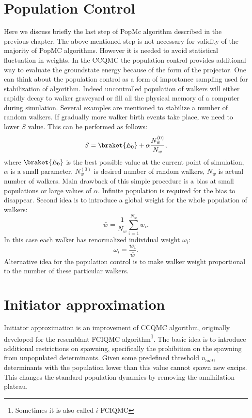 \documentclass[twoside,english]{uiofysmaster}
\begin{document}
\section{Population Control}
Here we discuss briefly the last step of PopMc algorithm described in the previous chapter. The above mentioned step is not necessary for validity of the majority of PopMC algorithms. However it is needed to avoid statistical fluctuation in weights. In the CCQMC the population control provides additional way to evaluate the groundstate energy because of the form of the projector. One can think about the population control as a form of importance sampling used for stabilization of algorithm. Indeed uncontrolled population of walkers will either rapidly decay to walker graveyard or fill all the physical memory of a computer during simulation. Several examples are mentioned to stabilize a number of random walkers. If gradually more walker birth events take place, we need to lower $S$ value. This can be performed as follows:
\begin{equation}
S = \braket{E_0} + \alpha \frac{N_w^{(0)}}{N_w},
\end{equation}  
where $\braket{E_0}$ is the best possible value at the current point of simulation, $\alpha$ is a small parameter, $N_w^{(0)}$ is desired number of random walkers, $N_w$ is actual number of walkers. Main drawback of this simple procedure is a bias at small populations or large values of $\alpha$. Infinite population is required for the bias to disappear.
Second idea is to introduce a global weight for the whole population of walkers:
\begin{equation}
\bar{w} = \frac{1}{N_w}\sum_{i=1}^{N_w}w_i.
\end{equation}  
In this case each walker has renormalized individual weight $\omega_i$:
\begin{equation}
\omega_i = \frac{w_i}{\bar{w}}.
\end{equation}  
Alternative idea for the population control is to make walker weight proportional to the number of these particular walkers.

\section{Initiator approximation}

Initiator approximation is an improvement of CCQMC algorithm, originally developed for the resemblant FCIQMC algorithm\footnote{Sometimes it is also called $i$-FCIQMC}. The basic idea is to introduce additional restrictions on spawning, specifically the prohibition on the spawning from unpopulated determinants. Given some predefined threshold $n_{add}$, determinants with the population lower than this value cannot spawn new excips. This changes the standard population dynamics by removing the annihilation plateau\cite{SpencerDevelopmentsstochasticcoupled2016}.  
\end{document}
